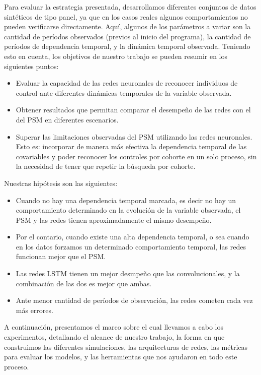 \documentclass[../main.tex]{subfiles}
\begin{document}
Para evaluar la estrategia presentada, desarrollamos diferentes conjuntos de datos
sintéticos de tipo panel\footnotemark, ya que en los casos reales algunos comportamientos
no pueden verificarse directamente. Aquí, algunos de los parámetros a variar son la
cantidad de períodos observados (previos al inicio del programa), la cantidad de períodos
de dependencia temporal, y la dinámica temporal observada. Teniendo esto en cuenta, los
objetivos de nuestro trabajo se pueden resumir en los siguientes puntos: 
\begin{itemize}
    \item Evaluar la capacidad de las redes neuronales de reconocer individuos de control
    ante diferentes dinámicas temporales de la variable observada.
    \item Obtener resultados que permitan comparar el desempeño de las redes con
    el del PSM en diferentes escenarios.
    \item Superar las limitaciones observadas del PSM utilizando las redes neuronales.
    Esto es: incorporar de manera más efectiva la dependencia temporal de las covariables
    y poder reconocer los controles por cohorte en un solo proceso, sin la necesidad de
    tener que repetir la búsqueda por cohorte.
\end{itemize}

Nuestras hipótesis son las siguientes:
\begin{itemize}
    \item Cuando no hay una dependencia temporal marcada, es decir no hay un
    comportamiento determinado en la evolución de la variable observada, el PSM y las
    redes tienen aproximadamente el mismo desempeño.
    \item Por el contario, cuando existe una alta dependencia temporal, o sea cuando en
    los datos forzamos un determinado comportamiento temporal, las redes funcionan mejor
    que el PSM.
    \item Las redes LSTM tienen un mejor desmpeño que las convolucionales, y la combinación
    de las dos es mejor que ambas.
    \item Ante menor cantidad de períodos de observación, las redes cometen cada
    vez más errores.
\end{itemize}

A continuación, presentamos el marco sobre el cual llevamos a cabo los experimentos,
detallando el alcance de nuestro trabajo, la forma en que construimos las diferentes
simulaciones, las arquitecturas de redes, las métricas para evaluar los modelos,
y las herramientas que nos ayudaron en todo este proceso.
\end{document}
